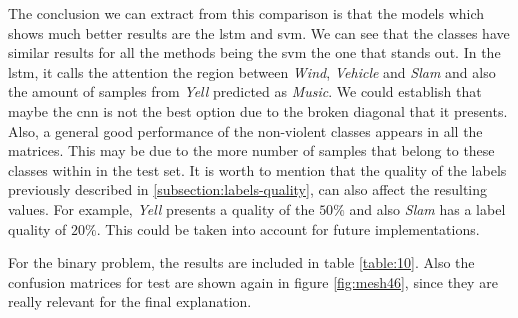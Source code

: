    The conclusion we can extract from this comparison is that the models which shows much better results are the \acrshort{lstm} and \acrshort{svm}. We can see that the classes have similar results for all the methods being the \acrshort{svm} the one that stands out. In the \acrshort{lstm}, it calls the attention the region between \textit{Wind}, \textit{Vehicle} and \textit{Slam} and also the amount of samples from \textit{Yell} predicted as \textit{Music}. We could establish that maybe the \acrshort{cnn} is not the best option due to the broken diagonal that it presents. Also, a general good performance of the non-violent classes appears in all the matrices. This may be due to the more number of samples that belong to these classes within in the test set. It is worth to mention that the quality of the labels previously described in \ref{subsection:labels-quality}, can also affect the resulting values. For example, \textit{Yell} presents a quality of the $50\%$ and also \textit{Slam} has a label quality of $20\%$. This could be taken into account for future implementations.
   
   For the binary problem, the results are included in table \ref{table:10}. Also the confusion matrices for test are shown again in figure \ref{fig:mesh46}, since they are really relevant for the final explanation.
	
	\begin{table}[h!]
		\begin{center}
		\end{center}
		\caption{Accuracy results for the three different algorithms and the three sets for the binary approach}
		\label{table:10}
	\end{table}
	
